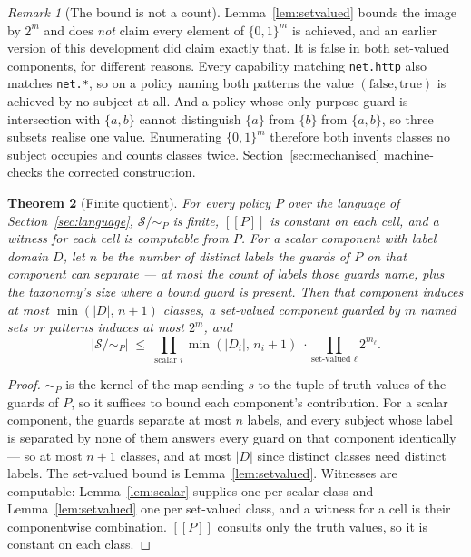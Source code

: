 \documentclass[11pt,a4paper]{article}
\theoremstyle{plain}
\newtheorem{theorem}{Theorem}
\theoremstyle{definition}
\theoremstyle{remark}
\newtheorem{remark}[theorem]{Remark}
\newcommand{\sem}[1]{[\![#1]\!]}
\newcommand{\Sub}{\mathcal{S}}
\begin{document}
\begin{remark}[The bound is not a count]
\label{rem:notacount}
Lemma~\ref{lem:setvalued} bounds the image by $2^m$ and does \emph{not} claim every element
of $\{0,1\}^m$ is achieved, and an earlier version of this development did claim exactly
that. It is false in both set-valued components, for different reasons. Every capability
matching \texttt{net.http} also matches \texttt{net.*}, so on a policy naming both patterns
the value $(\mathrm{false},\mathrm{true})$ is achieved by no subject at all. And a policy
whose only purpose guard is intersection with $\{a,b\}$ cannot distinguish $\{a\}$ from
$\{b\}$ from $\{a,b\}$, so three subsets realise one value. Enumerating $\{0,1\}^m$
therefore both invents classes no subject occupies and counts classes twice.
Section~\ref{sec:mechanised} machine-checks the corrected construction.
\end{remark}

\begin{theorem}[Finite quotient]
\label{thm:quotient}
For every policy $P$ over the language of Section~\ref{sec:language}, $\Sub/{\sim_P}$ is
finite, $\sem{P}$ is constant on each cell, and a witness for each cell is computable from
$P$. For a scalar component with label domain $D$, let $n$ be the number of distinct labels
the guards of $P$ on that component can separate --- at most the count of labels those
guards name, plus the taxonomy's size where a bound guard is present. Then that component
induces at most $\min(|D|,\, n+1)$ classes, a set-valued component guarded by $m$ named sets
or patterns induces at most $2^m$, and
\[
  |\Sub/{\sim_P}| \;\le\;
  \prod_{\text{scalar } i} \min\!\left(|D_i|,\, n_i + 1\right)
  \;\cdot \prod_{\text{set-valued } \ell} 2^{m_\ell}.
\]
\end{theorem}

\begin{proof}
$\sim_P$ is the kernel of the map sending $s$ to the tuple of truth values of the guards of
$P$, so it suffices to bound each component's contribution. For a scalar component, the
guards separate at most $n$ labels, and every subject whose label is separated by none of
them answers every guard on that component identically --- so at most $n+1$ classes, and at
most $|D|$ since distinct classes need distinct labels. The set-valued bound is
Lemma~\ref{lem:setvalued}. Witnesses are computable: Lemma~\ref{lem:scalar} supplies one per
scalar class and Lemma~\ref{lem:setvalued} one per set-valued class, and a witness for a cell
is their componentwise combination. $\sem{P}$ consults only the truth values, so it is
constant on each class.
\end{proof}
\end{document}
